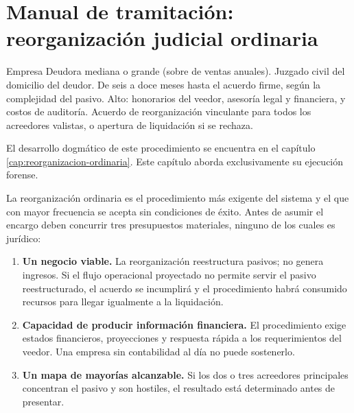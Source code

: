 \chapter{Manual de tramitación: reorganización judicial ordinaria}
\label{cap:tram-reorg-ordinaria}

\fichaProcedimiento
  {Empresa Deudora mediana o grande (sobre  de ventas anuales).}
  {Juzgado civil del domicilio del deudor.}
  {De seis a doce meses hasta el acuerdo firme, según la complejidad del pasivo.}
  {Alto: honorarios del veedor, asesoría legal y financiera, y costos de auditoría.}
  {Acuerdo de reorganización vinculante para todos los acreedores valistas, o apertura
   de liquidación si se rechaza.}

El desarrollo dogmático de este procedimiento se encuentra en el capítulo
\ref{cap:reorganizacion-ordinaria}. Este capítulo aborda exclusivamente su ejecución
forense.

\bloqueEncargo

La reorganización ordinaria es el procedimiento más exigente del sistema y el que con
mayor frecuencia se acepta sin condiciones de éxito. Antes de asumir el encargo deben
concurrir tres presupuestos materiales, ninguno de los cuales es jurídico:

\begin{enumerate}
  \item \textbf{Un negocio viable.} La reorganización reestructura pasivos; no genera
  ingresos. Si el flujo operacional proyectado no permite servir el pasivo
  reestructurado, el acuerdo se incumplirá y el procedimiento habrá consumido recursos
  para llegar igualmente a la liquidación.

  \item \textbf{Capacidad de producir información financiera.} El procedimiento exige
  estados financieros, proyecciones y respuesta rápida a los requerimientos del veedor.
  Una empresa sin contabilidad al día no puede sostenerlo.

  \item \textbf{Un mapa de mayorías alcanzable.} Si los dos o tres acreedores principales
  concentran el pasivo y son hostiles, el resultado está determinado antes de presentar.
\end{enumerate}

